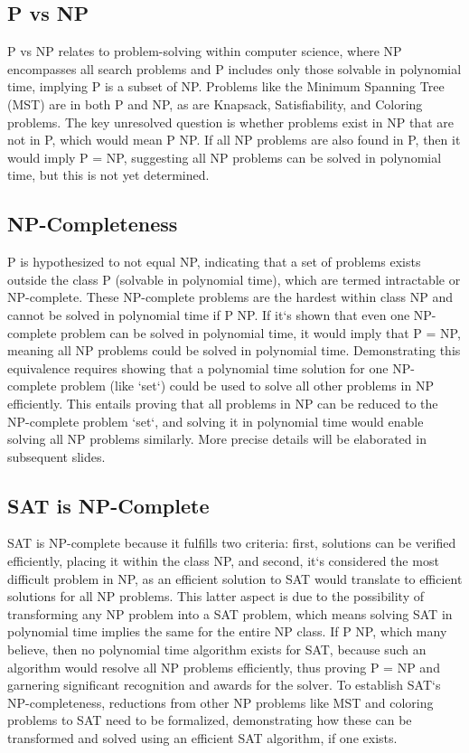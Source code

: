\subsection*{P vs NP}
P vs NP relates to problem-solving within computer science, where NP encompasses all search problems and P includes only those solvable in polynomial time, implying P is a subset of NP\@.
Problems like the Minimum Spanning Tree (MST) are in both P and NP, as are Knapsack, Satisfiability, and Coloring problems.
The key unresolved question is whether problems exist in NP that are not in P, which would mean P  NP\@.
If all NP problems are also found in P, then it would imply P = NP, suggesting all NP problems can be solved in polynomial time, but this is not yet determined.

\subsection*{NP-Completeness}
P is hypothesized to not equal NP, indicating that a set of problems exists outside the class P (solvable in polynomial time), which are termed intractable or NP-complete.
These NP-complete problems are the hardest within class NP and cannot be solved in polynomial time if P  NP\@.
If it`s shown that even one NP-complete problem can be solved in polynomial time, it would imply that P = NP, meaning all NP problems could be solved in polynomial time.
Demonstrating this equivalence requires showing that a polynomial time solution for one NP-complete problem (like `set`) could be used to solve all other problems in NP efficiently.
This entails proving that all problems in NP can be reduced to the NP-complete problem `set`, and solving it in polynomial time would enable solving all NP problems similarly.
More precise details will be elaborated in subsequent slides.

\subsection*{SAT is NP-Complete}
SAT is NP-complete because it fulfills two criteria: first, solutions can be verified efficiently, placing it within the class NP, and second, it`s considered the most difficult problem in NP, as an efficient solution to SAT would translate to efficient solutions for all NP problems.
This latter aspect is due to the possibility of transforming any NP problem into a SAT problem, which means solving SAT in polynomial time implies the same for the entire NP class.
If P  NP, which many believe, then no polynomial time algorithm exists for SAT, because such an algorithm would resolve all NP problems efficiently, thus proving P = NP and garnering significant recognition and awards for the solver.
To establish SAT`s NP-completeness, reductions from other NP problems like MST and coloring problems to SAT need to be formalized, demonstrating how these can be transformed and solved using an efficient SAT algorithm, if one exists.

